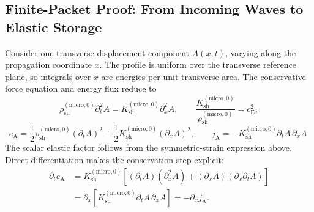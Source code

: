 \subsection{Finite-Packet Proof: From Incoming Waves to Elastic Storage}

Consider one transverse displacement component $A(x,t)$, varying along the propagation coordinate $x$. The profile is uniform over the transverse reference plane, so integrals over $x$ are energies per unit transverse area. The conservative force equation and energy flux reduce to
\begin{equation}
    \rho_{\mathrm{sh}}^{(\mathrm{micro},0)}\partial_t^2A
    =K_{\mathrm{sh}}^{(\mathrm{micro},0)}\partial_x^2A,
    \qquad
    \frac{K_{\mathrm{sh}}^{(\mathrm{micro},0)}}
    {\rho_{\mathrm{sh}}^{(\mathrm{micro},0)}}=c_{\mathrm E}^{2},
\end{equation}
\begin{equation}
    e_{\mathrm A}
    =\frac12\rho_{\mathrm{sh}}^{(\mathrm{micro},0)}(\partial_tA)^2
    +\frac12K_{\mathrm{sh}}^{(\mathrm{micro},0)}(\partial_xA)^2,
    \qquad
    j_{\mathrm A}
    =-K_{\mathrm{sh}}^{(\mathrm{micro},0)}\partial_tA\,\partial_xA.
\end{equation}
The scalar elastic factor follows from the symmetric-strain expression above. Direct differentiation makes the conservation step explicit:
\begin{align}
    \partial_te_{\mathrm A}
    &=K_{\mathrm{sh}}^{(\mathrm{micro},0)}
    \left[(\partial_tA)(\partial_x^2A)
    +(\partial_xA)(\partial_x\partial_tA)\right]
    \nonumber\\
    &=\partial_x\!\left[
    K_{\mathrm{sh}}^{(\mathrm{micro},0)}\partial_tA\,\partial_xA
    \right]
    =-\partial_xj_{\mathrm A}.
\end{align}

